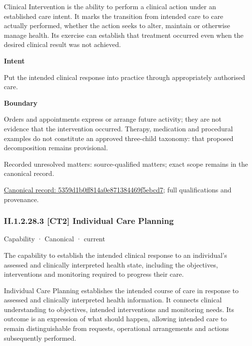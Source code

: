 Clinical Intervention is the ability to perform a clinical action under an established care intent. It marks the transition from intended care to care actually performed, whether the action seeks to alter, maintain or otherwise manage health. Its exercise can establish that treatment occurred even when the desired clinical result was not achieved.



\textbf{Intent}



Put the intended clinical response into practice through appropriately authorised care.



\textbf{Boundary}



Orders and appointments express or arrange future activity; they are not evidence that the intervention occurred. Therapy, medication and procedural examples do not constitute an approved three-child taxonomy: that proposed decomposition remains provisional.


{\small Recorded unresolved matters: source-qualified matters; exact scope remains in the canonical record.}\par
{\footnotesize \href{../../../../continuum/strategy/capability/5359d1b0ff814a0e871384469f5ebcd7.md}{Canonical record: 5359d1b0ff814a0e871384469f5ebcd7}; full qualifications and provenance.}\par
\subsubsection*{II.1.2.28.3 [CT2] Individual Care Planning}
\label{navigation:II.1.2.28.3}

\label{element:f036a9866459429a8fb5f5e10727b5e8}
{\small Capability · Canonical · current}\par

The capability to establish the intended clinical response to an individual's assessed and clinically interpreted health state, including the objectives, interventions and monitoring required to progress their care.



Individual Care Planning establishes the intended course of care in response to assessed and clinically interpreted health information. It connects clinical understanding to objectives, intended interventions and monitoring needs. Its outcome is an expression of what should happen, allowing intended care to remain distinguishable from requests, operational arrangements and actions subsequently performed.



